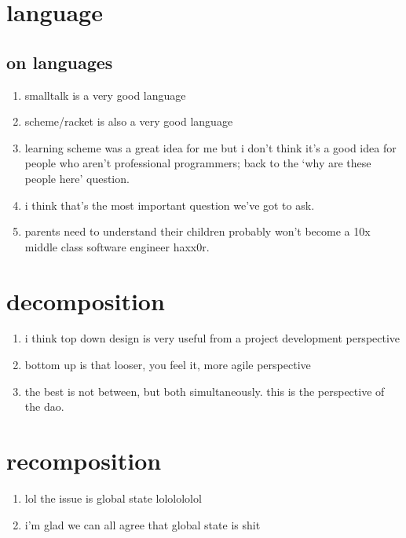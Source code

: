 \documentclass{article}
\begin{document}
	\section{language}
	\subsection{on languages}
	\begin{enumerate}
		\item smalltalk is a very good language
		\item scheme/racket is also a very good language
		\item learning scheme was a great idea for me but i don't think it's a good idea for people who aren't professional programmers; back to the `why are these people here' question.
		\item i think that's the most important question we've got to ask.
		\item parents need to understand their children probably won't become a 10x middle class software engineer haxx0r.
	\end{enumerate}
	\section{decomposition}
	\begin{enumerate}
		\item i think top down design is very useful from a project development perspective
		\item bottom up is that looser, you feel it, more agile perspective
		\item the best is not between, but both simultaneously. this is the perspective of the dao.
	\end{enumerate}
	\section{recomposition}
	\begin{enumerate}
		\item lol the issue is global state lololololol
		\item i'm glad we can all agree that global state is shit
	\end{enumerate}
\end{document}
